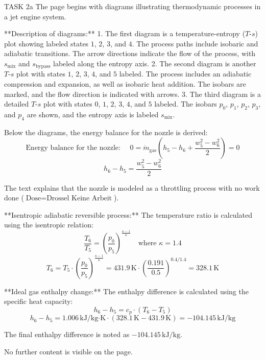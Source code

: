 TASK 2a  
The page begins with diagrams illustrating thermodynamic processes in a jet engine system.  

**Description of diagrams:**  
1. The first diagram is a temperature-entropy (\( T \)-\( s \)) plot showing labeled states \( 1 \), \( 2 \), \( 3 \), and \( 4 \). The process paths include isobaric and adiabatic transitions. The arrow directions indicate the flow of the process, with \( s_{\text{mix}} \) and \( s_{\text{bypass}} \) labeled along the entropy axis.  
2. The second diagram is another \( T \)-\( s \) plot with states \( 1 \), \( 2 \), \( 3 \), \( 4 \), and \( 5 \) labeled. The process includes an adiabatic compression and expansion, as well as isobaric heat addition. The isobars are marked, and the flow direction is indicated with arrows.  
3. The third diagram is a detailed \( T \)-\( s \) plot with states \( 0 \), \( 1 \), \( 2 \), \( 3 \), \( 4 \), and \( 5 \) labeled. The isobars \( p_0 \), \( p_1 \), \( p_2 \), \( p_3 \), and \( p_4 \) are shown, and the entropy axis is labeled \( s_{\text{mix}} \).  

Below the diagrams, the energy balance for the nozzle is derived:  
\[
\text{Energy balance for the nozzle: } \quad 0 = \dot{m}_{\text{gas}} \left( h_5 - h_6 + \frac{w_5^2 - w_6^2}{2} \right) = 0
\]
\[
h_6 - h_5 = \frac{w_5^2 - w_6^2}{2}
\]

The text explains that the nozzle is modeled as a throttling process with no work done (\( \text{Dose} = \text{Drossel Keine Arbeit} \)).  

**Isentropic adiabatic reversible process:**  
The temperature ratio is calculated using the isentropic relation:  
\[
\frac{T_6}{T_5} = \left( \frac{p_0}{p_5} \right)^{\frac{\kappa - 1}{\kappa}} \quad \text{where } \kappa = 1.4
\]
\[
T_6 = T_5 \cdot \left( \frac{p_0}{p_5} \right)^{\frac{\kappa - 1}{\kappa}} = 431.9 \, \text{K} \cdot \left( \frac{0.191}{0.5} \right)^{0.4/1.4} = 328.1 \, \text{K}
\]

**Ideal gas enthalpy change:**  
The enthalpy difference is calculated using the specific heat capacity:  
\[
h_6 - h_5 = c_p \cdot \left( T_6 - T_5 \right)
\]
\[
h_6 - h_5 = 1.006 \, \text{kJ/kg·K} \cdot \left( 328.1 \, \text{K} - 431.9 \, \text{K} \right) = -104.145 \, \text{kJ/kg}
\]

The final enthalpy difference is noted as \( -104.145 \, \text{kJ/kg} \).  

No further content is visible on the page.